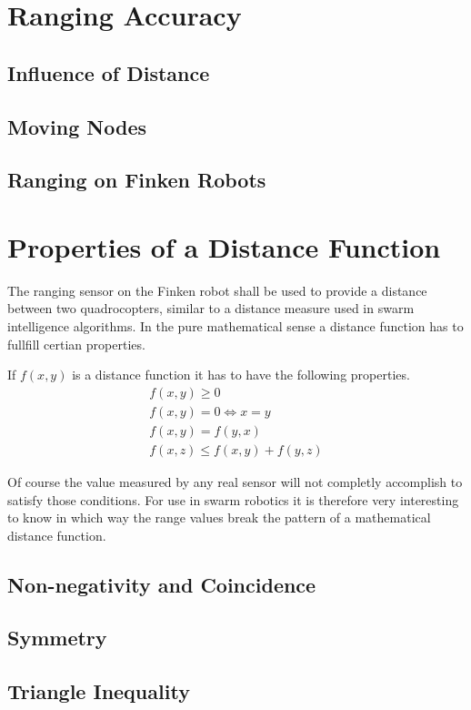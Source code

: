 


\section{Ranging Accuracy}
\subsection{Influence of Distance}

\subsection{Moving Nodes}

\subsection{Ranging on Finken Robots}

\section{Properties of a Distance Function}
The ranging sensor on the Finken robot shall be used to provide a distance between two quadrocopters, similar to a distance measure used in swarm intelligence algorithms.
In the pure mathematical sense a distance function has to fullfill certian properties.

If $f(x, y)$ is a distance function it has to have the following properties.
\begin{eqnarray}
f(x, y) \ge 0 \\
f(x, y) = 0 \iff x = y \\ 
f(x, y) = f(y, x) \\ 
f(x, z) \le f(x, y) + f(y, z)
\end{eqnarray}

Of course the value measured by any real sensor will not completly accomplish to satisfy those conditions.
For use in swarm robotics it is therefore very interesting to know in which way the range values break the pattern of a mathematical distance function.

\subsection{Non-negativity and Coincidence}

\subsection{Symmetry}

\subsection{Triangle Inequality}

